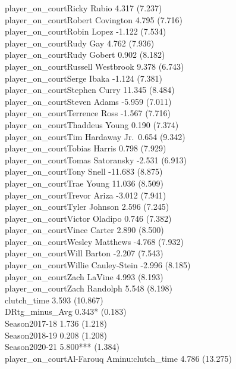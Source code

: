 \documentclass[
  landscape]{article}
\begin{document}
player\_on\_courtRicky Rubio 4.317 (7.237)\\
player\_on\_courtRobert Covington 4.795 (7.716)\\
player\_on\_courtRobin Lopez -1.122 (7.534)\\
player\_on\_courtRudy Gay 4.762 (7.936)\\
player\_on\_courtRudy Gobert 0.902 (8.182)\\
player\_on\_courtRussell Westbrook 9.378 (6.743)\\
player\_on\_courtSerge Ibaka -1.124 (7.381)\\
player\_on\_courtStephen Curry 11.345 (8.484)\\
player\_on\_courtSteven Adams -5.959 (7.011)\\
player\_on\_courtTerrence Ross -1.567 (7.716)\\
player\_on\_courtThaddeus Young 0.190 (7.374)\\
player\_on\_courtTim Hardaway Jr.~0.654 (9.342)\\
player\_on\_courtTobias Harris 0.798 (7.929)\\
player\_on\_courtTomas Satoransky -2.531 (6.913)\\
player\_on\_courtTony Snell -11.683 (8.875)\\
player\_on\_courtTrae Young 11.036 (8.509)\\
player\_on\_courtTrevor Ariza -3.012 (7.941)\\
player\_on\_courtTyler Johnson 2.596 (7.245)\\
player\_on\_courtVictor Oladipo 0.746 (7.382)\\
player\_on\_courtVince Carter 2.890 (8.500)\\
player\_on\_courtWesley Matthews -4.768 (7.932)\\
player\_on\_courtWill Barton -2.207 (7.543)\\
player\_on\_courtWillie Cauley-Stein -2.996 (8.185)\\
player\_on\_courtZach LaVine 4.993 (8.193)\\
player\_on\_courtZach Randolph 5.548 (8.198)\\
clutch\_time 3.593 (10.867)\\
DRtg\_minus\_Avg 0.343* (0.183)\\
Season2017-18 1.736 (1.218)\\
Season2018-19 0.208 (1.208)\\
Season2020-21 5.800*** (1.384)\\
player\_on\_courtAl-Farouq Aminu:clutch\_time 4.786 (13.275)\\
\end{document}

